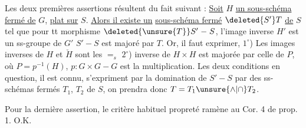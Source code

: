 Les deux premières assertions résultent
du fait suivant : \uline{Soit} $H$ \uline{un sous-schéma
fermé de} $G$,  \uline{plat sur} $S$. \uline{Alors il existe un}
 \uline{sous-schéma fermé} $\deleted{S'}T$ \uline{de} $S$
tel que pour tt morphisme $\deleted{\unsure{T}}S'\mathrel{-}S$,
l'image inverse $H'$ est un ss-groupe de $G'$
 $S'\mathrel{-}S$ est majoré par $T$. Or,
il faut exprimer,  $1^\circ$) Les images
inverses de $H$ et $\check H$ sont les ${=}_{s}$
$2^\circ$)  inverse de $H\times H$ est
majorée par celle de $P$, où
$P=p^{-1}(H)$, $p:G\times G\mathrel{-}G$ est la
multiplication. Les deux  conditions
en question, il est connu, s'expriment
par la  domination de $S'\mathrel{-}S$ par
des ss-schémas fermés $T_1$, $T_2$ de $S$,
on prendra donc $T=T_1\unsure{\wedge|\cap} T_2$.

Pour la dernière assertion, le critère
habituel  propreté  ramène au
Cor. 4 \unsure{,} de prop. 1. O.K.

